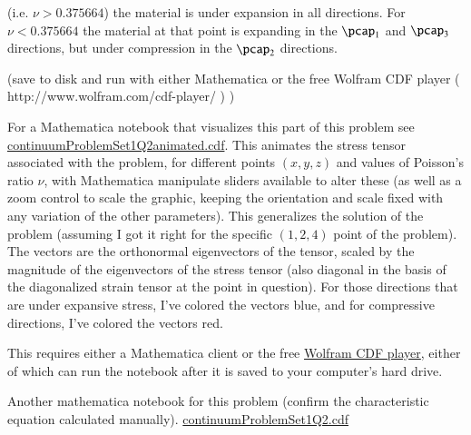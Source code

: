 \begin{Answer}[ref={problem:continuumProblemSet1:q2b}]
(i.e. $\nu > 0.375664$) the material is under expansion in all directions.  For $\nu < 0.375664$ the material at that point is expanding in the $\pcap_1$ and $\pcap_3$ directions, but under compression in the $\pcap_2$ directions.

(save to disk and run with either Mathematica or the free Wolfram CDF player ( http://www.wolfram.com/cdf-player/  ) )

For a Mathematica notebook that visualizes this part of this problem see \href{https://raw.github.com/peeterjoot/physicsplay/master/notes/phy454/mathematica/continuumProblemSet1Q2animated.cdf}{continuumProblemSet1Q2animated.cdf}.  This animates the stress tensor associated with the problem, for different points $(x,y,z)$ and values of Poisson's ratio $\nu$, with Mathematica manipulate sliders available to alter these (as well as a zoom control to scale the graphic, keeping the orientation and scale fixed with any variation of the other parameters).  This generalizes the solution of the problem (assuming I got it right for the specific $(1,2,4)$ point of the problem).  The vectors are the orthonormal eigenvectors of the tensor, scaled by the magnitude of the eigenvectors of the stress tensor (also diagonal in the basis of the diagonalized strain tensor at the point in question).  For those directions that are under expansive stress, I've colored the vectors blue, and for compressive directions, I've colored the vectors red.

This requires either a Mathematica client or the free \href{http://www.wolfram.com/cdf-player/}{Wolfram CDF player}, either of which can run the notebook after it is saved to your computer's hard drive.

Another mathematica notebook for this problem (confirm the characteristic equation calculated manually).
\href{https://raw.github.com/peeterjoot/physicsplay/master/notes/phy454/mathematica/continuumProblemSet1Q2.cdf}{continuumProblemSet1Q2.cdf}
\end{Answer}

